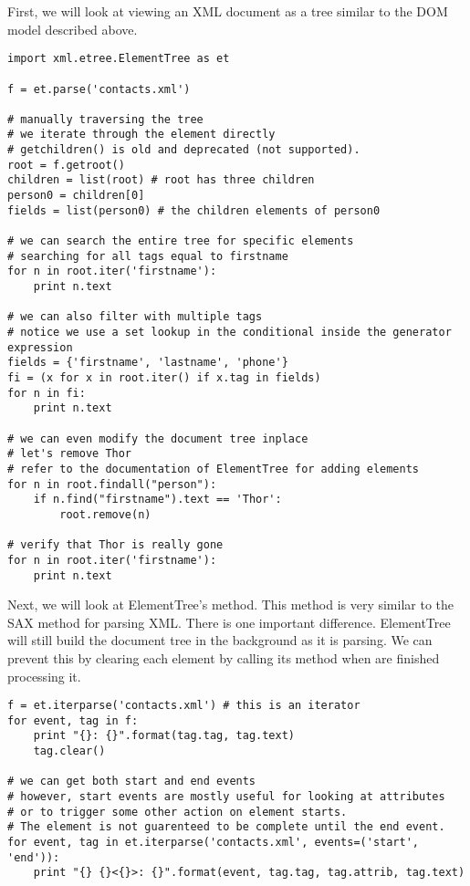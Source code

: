 First, we will look at viewing an XML document as a tree similar to the DOM model described above.
\begin{lstlisting}
import xml.etree.ElementTree as et

f = et.parse('contacts.xml')

# manually traversing the tree
# we iterate through the element directly
# getchildren() is old and deprecated (not supported).
root = f.getroot()
children = list(root) # root has three children
person0 = children[0]
fields = list(person0) # the children elements of person0

# we can search the entire tree for specific elements
# searching for all tags equal to firstname
for n in root.iter('firstname'):
    print n.text
    
# we can also filter with multiple tags 
# notice we use a set lookup in the conditional inside the generator expression
fields = {'firstname', 'lastname', 'phone'}
fi = (x for x in root.iter() if x.tag in fields)
for n in fi:
    print n.text
    
# we can even modify the document tree inplace
# let's remove Thor
# refer to the documentation of ElementTree for adding elements
for n in root.findall("person"):
    if n.find("firstname").text == 'Thor':
        root.remove(n)

# verify that Thor is really gone
for n in root.iter('firstname'):
    print n.text
\end{lstlisting}

Next, we will look at ElementTree's  method.
This method is very similar to the SAX method for parsing XML.
There is one important difference.
ElementTree will still build the document tree in the background as it is parsing.
We can prevent this by clearing each element by calling its  method when are finished processing it.
\begin{lstlisting}
f = et.iterparse('contacts.xml') # this is an iterator
for event, tag in f:
    print "{}: {}".format(tag.tag, tag.text)
    tag.clear()
    
# we can get both start and end events
# however, start events are mostly useful for looking at attributes
# or to trigger some other action on element starts.
# The element is not guarenteed to be complete until the end event.
for event, tag in et.iterparse('contacts.xml', events=('start', 'end')):
    print "{} {}<{}>: {}".format(event, tag.tag, tag.attrib, tag.text)
\end{lstlisting}



